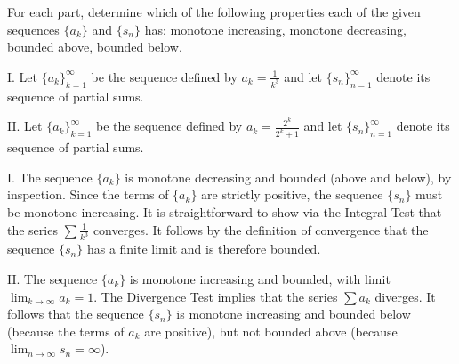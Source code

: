 \documentclass[]{ximera}
\begin{document}
\begin{problem}
For each part, determine which of the following properties each of the given sequences $\{a_k\}$ and $\{s_n\}$ has: monotone increasing, monotone decreasing, bounded above, bounded below. 

I. Let $\{a_k\}_{k=1}^\infty$ be the sequence defined by $a_k = \frac{1}{k^3}$ and let $\{s_n\}_{n=1}^\infty$ denote its sequence of partial sums. 

II. Let $\{a_k\}_{k=1}^\infty$ be the sequence defined by $a_k = \frac{2^k}{2^k +1}$ and let $\{s_n\}_{n=1}^\infty$ denote its sequence of partial sums.

\begin{solution}
I. The sequence $\{a_k\}$ is monotone decreasing and bounded (above and below), by inspection. Since the terms of $\{a_k\}$ are strictly positive, the sequence $\{s_n\}$ must be monotone increasing. It is straightforward to show via the Integral Test that the series $\sum \frac{1}{k^3}$ converges. It follows by the definition of convergence that the sequence $\{s_n\}$ has a finite limit and is therefore bounded.

II. The sequence $\{a_k\}$ is monotone increasing and bounded, with limit $\lim_{k\rightarrow \infty} a_k = 1$. The Divergence Test implies that the series $\sum a_k$ diverges. It follows that the sequence $\{s_n\}$ is monotone increasing and bounded below (because the terms of $a_k$ are positive), but not bounded above (because $\lim_{n \rightarrow \infty} s_n = \infty$). 
\end{solution}
\end{problem}
\end{document}
